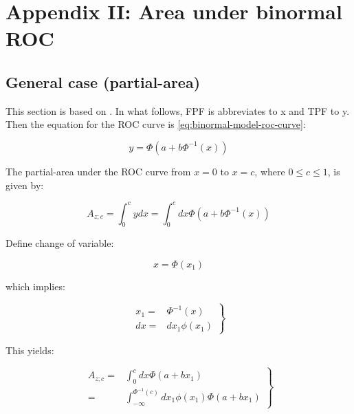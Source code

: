 \documentclass[
]{book}
\begin{document}
\hypertarget{binormal-model-appendix-2}{%
\section{Appendix II: Area under binormal ROC}\label{binormal-model-appendix-2}}

\hypertarget{binormal-model-appendix-1-partial-auc}{%
\subsection{General case (partial-area)}\label{binormal-model-appendix-1-partial-auc}}

This section is based on \citep{thompson1989statistical}. In what follows, FPF is abbreviates to x and TPF to y. Then the equation for the ROC curve is \eqref{eq:binormal-model-roc-curve}:

\begin{equation} 
y=\Phi\left ( a + b \Phi^{-1} \left ( x \right ) \right )
\label{eq:binormal-model-xy}
\end{equation}

The partial-area under the ROC curve from \(x = 0\) to \(x = c\), where \(0 ≤ c ≤ 1\), is given by:

\begin{equation} 
A_{z;c} = \int_{0}^{c} y dx =  \int_{0}^{c} dx \Phi\left ( a + b \Phi^{-1} \left ( x \right ) \right ) 
\label{eq:binormal-model-partial-area-1}
\end{equation}

Define change of variable:

\begin{equation} 
x = \Phi\left ( x_1 \right )
\label{eq:binormal-model-change-variable-1}
\end{equation}

which implies:

\begin{equation}
\left. 
\begin{aligned}
x_1 = &  \Phi^{-1}\left ( x \right ) \\
dx = &  dx_1 \phi\left ( x_1 \right )
\end{aligned}
\right \}
\label{eq:binormal-model-dx-dx1}
\end{equation}

This yields:

\begin{equation}
\left. 
\begin{aligned}
A_{z;c} = &  \int_{0}^{c} dx \Phi \left ( a + b x_1 \right )\\
 = &  \int_{-\infty}^{\Phi^{-1}\left ( c \right )} dx_1 \phi\left ( x_1 \right )\Phi \left ( a + b x_1 \right )
\end{aligned}
\right \}
\label{eq:binormal-model-partial-area-2}
\end{equation}
\end{document}
